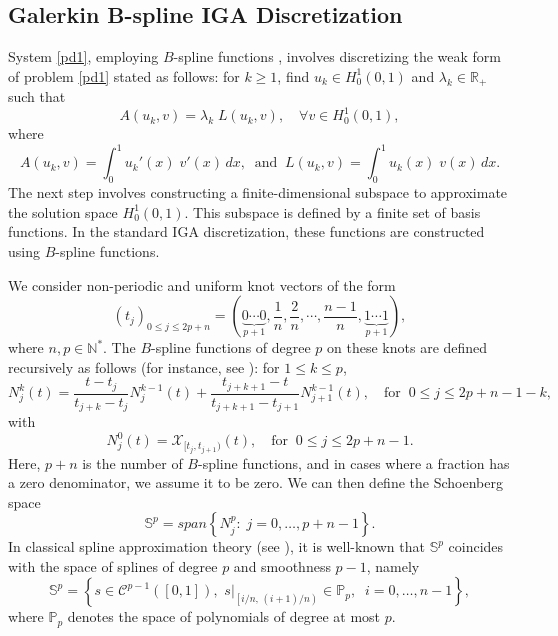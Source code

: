 \documentclass[11pt]{article}
\begin{document}
\subsection{Galerkin B-spline IGA Discretization}\label{sec:descritization}
System \eqref{pd1}, employing $B$-spline functions \cite{de1978practical}, involves discretizing the weak form of problem \eqref{pd1} stated as follows: for $k \geq 1$, find $u_k \in H^1_0(0,1)$ and $\lambda_k \in \mathbb{R}_+$ such that
\begin{equation}\label{pd2}
A(u_k,v)=\lambda_k \;L(u_k,v),\quad \forall v \in H^1_0(0,1),
\end{equation}
where 
$$ A(u_k,v)=\displaystyle\int_0^1u_k'(x)\;v'(x) \, dx,\;\;\text{and}\;\; L(u_k,v)=\displaystyle\int_0^1 u_k(x)\;v(x) \, dx. $$
The next step involves constructing a finite-dimensional subspace to approximate the solution space $H^1_0(0,1)$. This subspace is defined by a finite set of basis functions. In the standard IGA discretization, these functions are constructed using $B$-spline functions.

We consider non-periodic and uniform knot vectors of the form
$$
(t_j)_{0 \leq j \leq 2p+n}=\left( \displaystyle\underbrace{0\cdots0}_{p+1},\dfrac{1}{n},\dfrac{2}{n},\cdots,\dfrac{n-1}{n},\displaystyle\underbrace{1\cdots1}_{p+1} \right),
$$
where $n, p \in \mathbb{N}^*$. The $B$-spline functions of degree $p$ on these knots are defined recursively as follows (for instance, see \cite{de1978practical}): for $1 \leq k \leq p$,
\begin{equation}\label{eq:definition-B-spline-1}
N_j^k(t)=\dfrac{t-t_j}{t_{j+k}-t_{j}}N_j^{k-1}(t) +  \dfrac{t_{j+k+1}-t}{t_{j+k+1}-t_{j+1}}N_{j+1}^{k-1}(t),\quad\text{for}\;\;  0 \leq j \leq 2p+n-1-k,   
\end{equation}
with
\begin{equation}\label{eq:definition-B-spline-2}
N_j^0(t)=\mathcal{X}_{[t_j,t_{j+1})}(t),\quad\text{for}\;\;0 \leq j \leq 2p+n-1.
\end{equation}
Here, $p+n$ is the number of $B$-spline functions, and in cases where a fraction has a zero denominator, we assume it to be zero. We can then define the Schoenberg space
\begin{equation}\label{eq:Schoenberg-space}
\mathbb{S}^{p} = span \left\{ N_j^p: \; j=0, \dots,p+n-1 \right\}.
\end{equation}
In classical spline approximation theory (see \cite{de1978practical}), it is well-known that  $\mathbb{S}^{p}$ coincides with the space of splines of degree $p$ and smoothness $p-1$, namely
$$
\mathbb{S}^{p} = \left\{ s \in \mathcal{C}^{p-1}([0,1]),\,\,s|_{\left[ i/n, \, (i+1)/n \right)} \in \mathbb{P}_{p},\;\; i=0,\dots,n-1 \right\},
$$ 
where $\mathbb{P}_{p}$ denotes the space of polynomials of degree at most $p$.
\end{document}
